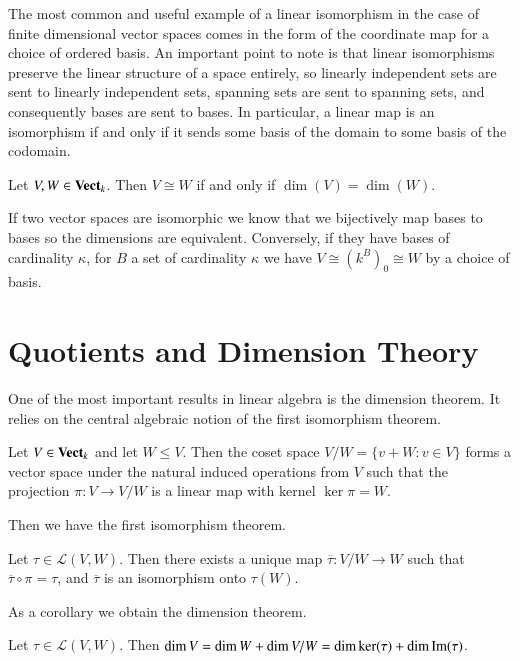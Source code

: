 The most common and useful example of a linear isomorphism in the case of finite dimensional vector spaces comes in the form of the coordinate map for a choice of ordered basis. An important point to note is that linear isomorphisms preserve the linear structure of a space entirely, so linearly independent sets are sent to linearly independent sets, spanning sets are sent to spanning sets, and consequently bases are sent to bases. In particular, a linear map is an isomorphism if and only if it sends some basis of the domain to some basis of the codomain.

\begin{theorem}
    Let $V,W\in \normalfont\textbf{Vect}_{k}$. Then $V\cong W$ if and only if $\dim(V) = \dim(W)$.
\end{theorem}
If two vector spaces are isomorphic we know that we bijectively map bases to bases so the dimensions are equivalent. Conversely, if they have bases of cardinality $\kappa$, for $B$ a set of cardinality $\kappa$ we have $V \cong (k^B)_0 \cong W$ by a choice of basis.

\section{Quotients and Dimension Theory}\label{sec:Dim}

One of the most important results in linear algebra is the dimension theorem. It relies on the central algebraic notion of the first isomorphism theorem.

\begin{definition}\label{Quotient space}
    Let $V \in \normalfont\textbf{Vect}_{k}$ and let $W \leq V$. Then the coset space $V/W = \{v+W:v \in V\}$ forms a vector space under the natural induced operations from $V$ such that the projection $\pi:V\rightarrow V/W$ is a linear map with kernel $\ker\pi = W$.
\end{definition}

Then we have the first isomorphism theorem.

\begin{theorem}
    Let $\tau \in \mathcal{L}(V,W)$. Then there exists a unique map $\overline{\tau}:V/W\rightarrow W$ such that $\overline{\tau} \circ \pi = \tau$, and $\overline{\tau}$ is an isomorphism onto $\tau(W)$.
\end{theorem}

As a corollary we obtain the dimension theorem.

\begin{corollary}
    Let $\tau \in \mathcal{L}(V,W)$. Then $\dim V = \dim W + \dim V/W = \dim\ker(\tau)+\dim\operatorname{Im}(\tau)$.
\end{corollary}


